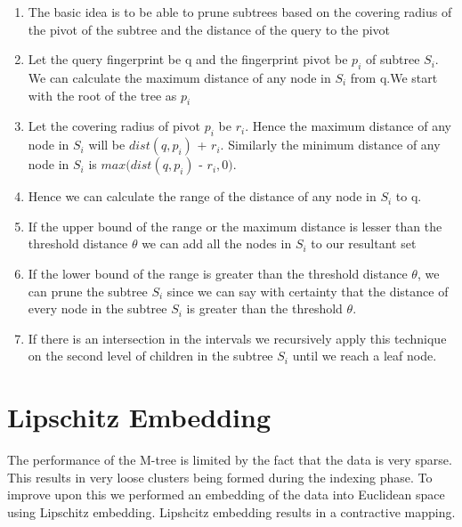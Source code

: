 \begin{enumerate}
	\item The basic idea is to be able to prune subtrees based on the covering radius of the pivot of the subtree and the distance of the query to the pivot
	 
	\item Let the query fingerprint be q and the fingerprint pivot be $p_i$ of subtree $S_i$. We can calculate the maximum distance of any node in $S_i$ from q.We start with the root of the tree as $p_i$
	
	\item Let the covering radius of pivot $p_i$ be $r_i$. Hence the maximum distance of any node in $S_i$ will be $dist(q,p_i)$ + $r_i$. Similarly the minimum distance of any node in $S_i$ is $max(dist(q,p_i)$ - $r_i, 0)$. 
	
	\item Hence we can calculate the range of the distance of any node in $S_i$ to q. 
	
	\item  If the upper bound of the range or the maximum distance is lesser than the threshold distance $\theta$ we can add all the nodes in $S_i$ to our resultant set
	
	\item If the lower bound of the range is greater than the threshold distance $\theta$, we can prune the subtree $S_i$ since we can say with certainty that the distance of every node in the subtree $S_i$ is greater than  the threshold $\theta$.
	
	\item If there is an intersection in the intervals we recursively apply this technique on the second level of children in the subtree $S_i$ until we reach a leaf node.
	
\end{enumerate}



\section{Lipschitz Embedding}

The performance of the M-tree is limited by the fact that the data is very sparse. This results in very loose clusters being formed during the indexing phase. To improve upon this we performed an embedding of the data into Euclidean space using Lipschitz embedding. Lipshcitz embedding results in a contractive mapping.\\

